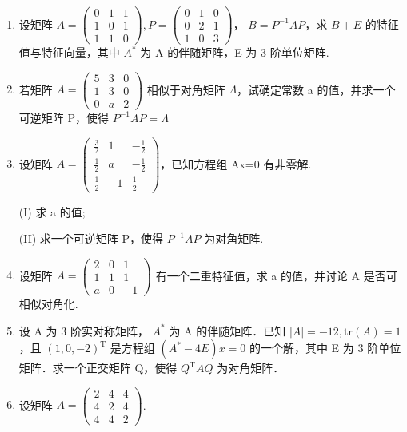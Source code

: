 \documentclass[12pt, a4paper]{ctexart}
\begin{document}
\begin{enumerate}[start=12]
    \item 设矩阵 $ A=\begin{pmatrix}0&1&1\\1&0&1\\1&1&0\end{pmatrix},P=\begin{pmatrix}0&1&0\\0&2&1\\1&0&3\end{pmatrix} $， $ B=P^{-1}AP $，求 $ B+E $ 的特征值与特征向量，其中 $ A^{*} $ 为 A 的伴随矩阵，E 为 3 阶单位矩阵.

    \item 若矩阵 $ A = \begin{pmatrix} 5 & 3 & 0 \\ 1 & 3 & 0 \\ 0 & a & 2 \end{pmatrix} $ 相似于对角矩阵 $ \Lambda $，试确定常数 a 的值，并求一个可逆矩阵 P，使得 $ P^{-1}AP = \Lambda $

    \item 设矩阵 $ A=\begin{pmatrix}\frac{3}{2}&1&-\frac{1}{2}\\\frac{1}{2}&a&-\frac{1}{2}\\\frac{1}{2}&-1&\frac{1}{2}\end{pmatrix} $，已知方程组 Ax=0 有非零解.
    
    (I) 求 a 的值;
    
    (II) 求一个可逆矩阵 P，使得 $ P^{-1}AP $ 为对角矩阵.

    \item 设矩阵 $ A = \begin{pmatrix} 2 & 0 & 1 \\ 1 & 1 & 1 \\ a & 0 & -1 \end{pmatrix} $ 有一个二重特征值，求 a 的值，并讨论 A 是否可相似对角化.

    \item 设 A 为 3 阶实对称矩阵， $ A^* $ 为 A 的伴随矩阵．已知 $ |A| = -12, \mathrm{tr}(A) = 1 $，且 $ (1,0,-2)^\mathrm{T} $ 是方程组 $ \left(A^* - 4E\right)x = 0 $ 的一个解，其中 E 为 3 阶单位矩阵．求一个正交矩阵 Q，使得 $ Q^\mathrm{T}AQ $ 为对角矩阵．

    \item 设矩阵 $ A = \begin{pmatrix} 2 & 4 & 4 \\ 4 & 2 & 4 \\ 4 & 4 & 2 \end{pmatrix} $.
    

\end{enumerate}
\end{document}
